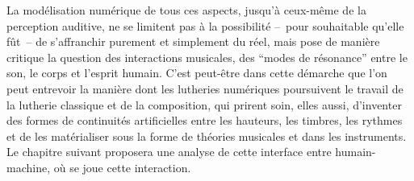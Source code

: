 \indent La modélisation numérique de tous ces aspects, jusqu'à ceux-même de la perception auditive, ne se limitent pas à la possibilité --~pour souhaitable qu'elle fût~-- de s'affranchir purement et simplement du réel, mais pose de manière critique la question des interactions musicales, des ``modes de résonance'' entre le son, le corps et l'esprit humain. C'est peut-être dans cette démarche que l'on peut entrevoir la manière dont les lutheries numériques poursuivent le travail de la lutherie classique et de la composition, qui prirent soin, elles aussi, d'inventer des formes de continuités artificielles entre les hauteurs, les timbres, les rythmes et de les matérialiser sous la forme de théories musicales et dans les instruments. Le chapitre suivant proposera une analyse de cette interface entre humain-machine, où se joue cette interaction.















